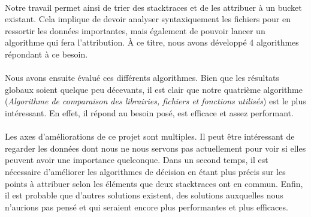 \documentclass{article}
\begin{document}
\paragraph{}
Notre travail permet ainsi de trier des stacktraces et de les attribuer à un bucket existant. Cela implique de devoir analyser syntaxiquement les fichiers pour en ressortir les données importantes, mais également de pouvoir lancer un algorithme qui fera l'attribution. À ce titre, nous avons développé 4 algorithmes répondant à ce besoin.

\paragraph{}
Nous avons ensuite évalué ces différents algorithmes. Bien que les résultats globaux soient quelque peu décevants, il est clair que notre quatrième algorithme (\textit{Algorithme de comparaison des librairies, fichiers et fonctions utilisés}) est le plus intéressant. En effet, il répond au besoin posé, est efficace et assez performant.

\paragraph{}
Les axes d'améliorations de ce projet sont multiples. Il peut être intéressant de regarder les données dont nous ne nous servons pas actuellement pour voir si elles peuvent avoir une importance quelconque. Dans un second temps, il est nécessaire d'améliorer les algorithmes de décision en étant plus précis sur les points à attribuer selon les éléments que deux stacktraces ont en commun. Enfin, il est probable que d'autres solutions existent, des solutions auxquelles nous n'aurions pas pensé et qui seraient encore plus performantes et plus efficaces.
\end{document}
